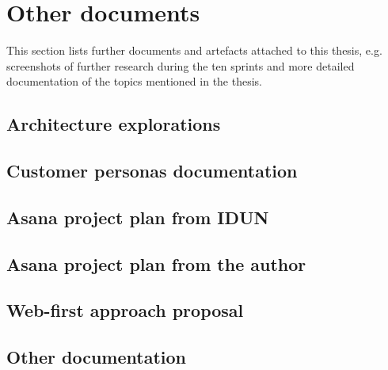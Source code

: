 \chapter{Other documents}
\label{appendix7-other-documents}

This section lists further documents and artefacts attached to this thesis, e.g. screenshots of further research during the ten sprints and more detailed documentation of the topics mentioned in the thesis.

\section*{Architecture explorations}

\section*{Customer personas documentation}

\section*{Asana project plan from IDUN}

\section*{Asana project plan from the author}

\section*{Web-first approach proposal}

\section*{Other documentation}
